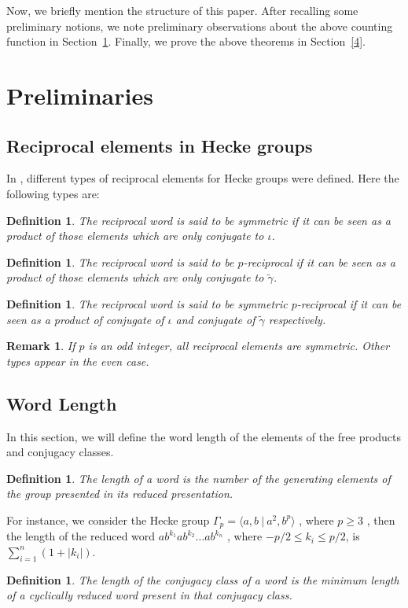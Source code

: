 \documentclass[11pt]{amsart}
\numberwithin{equation}{section}
\newtheorem{defn}[theorem]{Definition}
\newtheorem{rk}[theorem]{Remark}
\newcommand{\gt}{\tilde{\gamma}}
\newcommand{\io}{\iota }
\newcommand{\secref}[1]{Section~\ref{#1}}
\numberwithin{equation}{section}
\begin{document}
        
	 Now, we briefly mention the structure of this paper. After recalling some preliminary notions, we note preliminary observations about the above counting function in \secref{prel}. Finally, we prove the above theorems in \secref{4}.  
	
	
	\section{Preliminaries}\label{prel}
	
	\subsection{Reciprocal elements in Hecke groups}In \cite{DG}, different types of reciprocal elements for Hecke groups were defined. Here the following types are:
	\begin{defn}
		The reciprocal word is said to be \textit{symmetric} if it can be seen as a product of those elements which are only conjugate to $ \io $.
	\end{defn}
	\begin{defn}
		The reciprocal word is said to be \textit{$ p $-reciprocal} if it can be seen as a product of those elements which are only conjugate to $ \gt $.
	\end{defn}
	\begin{defn}
		The reciprocal word is said to be \textit{symmetric $ p $-reciprocal} if it can be seen as a product of conjugate of $\io$ and conjugate of $ \gt $ respectively.
	\end{defn}
	\begin{rk}
		If $p$ is an odd integer, all reciprocal elements are symmetric. Other types appear in the even case.
	\end{rk}
	\subsection{Word Length} In this section, we will define the word length of the elements of the free products and conjugacy classes.
	\begin{defn}\label{word}
		The\textit{ length} of a word is the number of the generating elements of the group presented in its reduced presentation.
	\end{defn}
	For instance, we consider the Hecke group $\Gamma_{p} =\langle a, b ~ | ~ a^{2},b^{p} \rangle  $ , where $p\geq 3$ , then the length of the reduced word $ ab^{k_{1}}ab^{k_{2}}\dots ab^{k_{n}} $ , where $-p/2\leq k_{i}\leq p/2 $, is $ \sum_{i=1}^{n}\left(1+|{k_{i}}|\right) $.
	\begin{defn}
		The \emph{length} of the conjugacy class of a word is the minimum length of a cyclically reduced word present in that conjugacy class.
	\end{defn}
    
\end{document}
